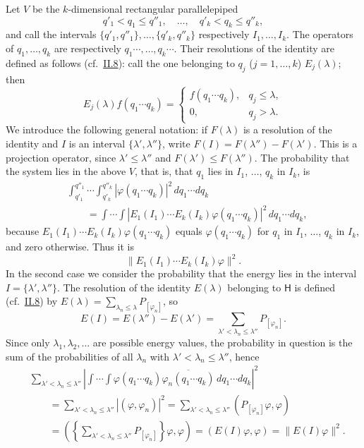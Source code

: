 \documentclass[fontsize=13pt,twoside,openany,headings=normal,parskip=false,bookmarkpackage=false,DIV=calc]{scrbook}
\begin{document}
Let $V$ be the $k$-dimensional rectangular parallelepiped
\[
q'_1<q_1\le q''_1,\quad\ldots,\quad q'_k<q_k\le q''_k,
\]
and call the intervals $\{q'_1,q''_1\},\ldots,\{q'_k,q''_k\}$ respectively $I_1,\ldots,I_k$. The operators of $q_1,\ldots,q_k$ are respectively $q_1\cdots,\ldots,q_k\cdots$. Their resolutions of the identity are defined as follows (cf.\ \hyperref[sec:II.8]{II.8}): call the one belonging to $q_j$ ($j=1,\ldots,k$) $E_j(\lambda)$; then
\[
E_j(\lambda)f(q_1\cdots q_k)=
\begin{cases}f(q_1\cdots q_k),&q_j\le\lambda,\\0,&q_j>\lambda.\end{cases}
\]
We introduce the following general notation: if $F(\lambda)$ is a resolution of the identity and $I$ is an interval $\{\lambda',\lambda''\}$, write $F(I)=F(\lambda'')-F(\lambda')$. This is a projection operator, since $\lambda'\le\lambda''$ and $F(\lambda')\le F(\lambda'')$. The probability that the system lies in the above $V$, that is, that $q_1$ lies in $I_1$, $\ldots$, $q_k$ in $I_k$, is
\begin{align*}
&\int_{q'_1}^{q''_1}\cdots\int_{q'_k}^{q''_k}|\varphi(q_1\cdots q_k)|^2\,dq_1\cdots dq_k\\
&\qquad=\int\cdots\int|E_1(I_1)\cdots E_k(I_k)\varphi(q_1\cdots q_k)|^2\,dq_1\cdots dq_k,
\end{align*}
because $E_1(I_1)\cdots E_k(I_k)\varphi(q_1\cdots q_k)$ equals $\varphi(q_1\cdots q_k)$ for $q_1$ in $I_1$, $\ldots$, $q_k$ in $I_k$, and zero otherwise. Thus it is
\[
\|E_1(I_1)\cdots E_k(I_k)\varphi\|^2.
\]
In the second case we consider the probability that the energy lies in the interval $I=\{\lambda',\lambda''\}$. The resolution of the identity $E(\lambda)$ belonging to $\mathsf H$ is defined (cf.\ \hyperref[sec:II.8]{II.8}) by $E(\lambda)=\sum_{\lambda_n\le\lambda}P_{[\varphi_n]}$, so
\[
E(I)=E(\lambda'')-E(\lambda')=\sum_{\lambda'<\lambda_n\le\lambda''}P_{[\varphi_n]}.
\]
Since only $\lambda_1,\lambda_2,\ldots$ are possible energy values, the probability in question is the sum of the probabilities of all $\lambda_n$ with $\lambda'<\lambda_n\le\lambda''$, hence
\begin{align*}
&\sum_{\lambda'<\lambda_n\le\lambda''}
\left|\int\cdots\int\varphi(q_1\cdots q_k)\overline{\varphi_n(q_1\cdots q_k)}\,dq_1\cdots dq_k\right|^2\\
&\qquad=\sum_{\lambda'<\lambda_n\le\lambda''}|(\varphi,\varphi_n)|^2
=\sum_{\lambda'<\lambda_n\le\lambda''}(P_{[\varphi_n]}\varphi,\varphi)\\
&\qquad=\left(\left\{\sum_{\lambda'<\lambda_n\le\lambda''}P_{[\varphi_n]}\right\}\varphi,\varphi\right)
=(E(I)\varphi,\varphi)=\|E(I)\varphi\|^2.
\end{align*}
\hypertarget{origpage-104}{}%
\end{document}
